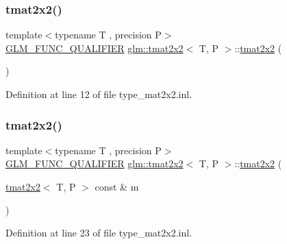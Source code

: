 \subsubsection{\texorpdfstring{tmat2x2()}{tmat2x2()}\hspace{0.1cm}{\footnotesize\ttfamily [1/22]}}
{\footnotesize\ttfamily template$<$typename T , precision P$>$ \\
\mbox{\hyperlink{setup_8hpp_a33fdea6f91c5f834105f7415e2a64407}{G\+L\+M\+\_\+\+F\+U\+N\+C\+\_\+\+Q\+U\+A\+L\+I\+F\+I\+ER}} \mbox{\hyperlink{structglm_1_1tmat2x2}{glm\+::tmat2x2}}$<$ T, P $>$\+::\mbox{\hyperlink{structglm_1_1tmat2x2}{tmat2x2}} (\begin{DoxyParamCaption}{ }\end{DoxyParamCaption})}



Definition at line 12 of file type\+\_\+mat2x2.\+inl.

\mbox{\label{structglm_1_1tmat2x2_a35326be3558b276f538fe1968eb22df5}} 
\subsubsection{\texorpdfstring{tmat2x2()}{tmat2x2()}\hspace{0.1cm}{\footnotesize\ttfamily [2/22]}}
{\footnotesize\ttfamily template$<$typename T , precision P$>$ \\
\mbox{\hyperlink{setup_8hpp_a33fdea6f91c5f834105f7415e2a64407}{G\+L\+M\+\_\+\+F\+U\+N\+C\+\_\+\+Q\+U\+A\+L\+I\+F\+I\+ER}} \mbox{\hyperlink{structglm_1_1tmat2x2}{glm\+::tmat2x2}}$<$ T, P $>$\+::\mbox{\hyperlink{structglm_1_1tmat2x2}{tmat2x2}} (\begin{DoxyParamCaption}\item[{\mbox{\hyperlink{structglm_1_1tmat2x2}{tmat2x2}}$<$ T, P $>$ const \&}]{m }\end{DoxyParamCaption})}



Definition at line 23 of file type\+\_\+mat2x2.\+inl.

\mbox{\label{structglm_1_1tmat2x2_a2f3cdab306325bbc4b1e1c57eb3a203a}} 
